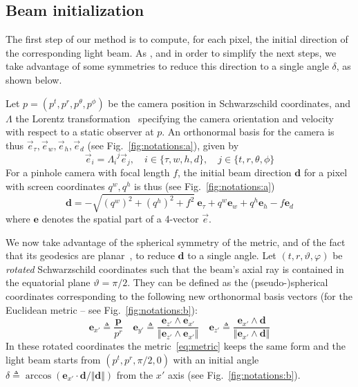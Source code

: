\documentclass{document}
\begin{document}
\subsection{Beam initialization}

The first step of our method is to compute, for each pixel, the initial 
direction of the corresponding light beam. As \cite{Muller2010}, and in order 
to simplify the next steps, we take advantage of some symmetries to reduce this 
direction to a single angle $\delta$, as shown below.

Let $p=(p^t, p^r, p^\theta, p^\phi)$ be the camera position in Schwarzschild 
coordinates, and $\Lambda$ the Lorentz transformation~\cite{weinberg1972} 
specifying the camera orientation and velocity with respect to a static 
observer at $p$. An orthonormal basis for the camera is thus $\vec{e}_{\tau}, 
\vec{e}_w, \vec{e}_h, \vec{e}_d$ (see Fig.~\ref{fig:notations:a}), given by
\begin{equation}
\vec{e}_i = {\Lambda_i}^j \vec{e}_j, \quad i \in \{\tau, w, h, d\}, \quad j \in 
\{t, r, \theta, \phi\} \label{eq:camerabasis}
\end{equation}
For a pinhole camera with focal length $f$, the initial beam direction 
$\mathbf{d}$ for a pixel with screen coordinates $q^w, q^h$ is thus (see 
Fig.~\ref{fig:notations:a})
\begin{equation}
{\mathbf d} = -\sqrt{(q^w)^2 + (q^h)^2 + f^2}\ {\mathbf e}_{\tau} + 
              q^w {\mathbf e}_w + 
              q^h {\mathbf e}_h - 
              f {\mathbf e}_d
\label{eq:d}
\end{equation}
where ${\mathbf e}$ denotes the spatial part of a 4-vector $\vec{e}$.

We now take advantage of the spherical symmetry of the metric, and of the fact 
that its geodesics are planar~\cite{weinberg1972}, to reduce ${\mathbf d}$ to a 
single angle. Let $(t, r, \vartheta, \varphi)$ be {\em rotated} Schwarzschild 
coordinates such that the beam's axial ray is contained in the equatorial plane 
$\vartheta = \pi/2$. They can be defined as the (pseudo-)spherical coordinates
corresponding to the following new orthonormal basis vectors (for the Euclidean
metric -- see Fig.~\ref{fig:notations:b}):
\begin{equation}
{\mathbf e}_{x'} \triangleq \frac{{\mathbf p}}{p^r} \quad
{\mathbf e}_{y'} \triangleq 
    \frac{{\mathbf e}_{z'} \wedge {\mathbf e}_{x'}}
         {\Vert {\mathbf e}_{z'} \wedge {\mathbf e}_{x'} \Vert} \quad
{\mathbf e}_{z'} \triangleq 
    \frac{{\mathbf e}_{x'} \wedge {\mathbf d}}
         {\Vert {\mathbf e}_{x'} \wedge {\mathbf d} \Vert}
\label{eq:raybasis}
\end{equation}
In these rotated coordinates the metric~\eqref{eq:metric} keeps the same form 
and the light beam starts from $(p^t, p^r, \pi/2, 0)$ with an initial angle 
$\delta \triangleq \arccos({\mathbf e}_{x'} \cdot {\mathbf d} / \Vert {\mathbf 
d} \Vert)$ from the $x'$ axis (see Fig.~\ref{fig:notations:b}).
\end{document}
